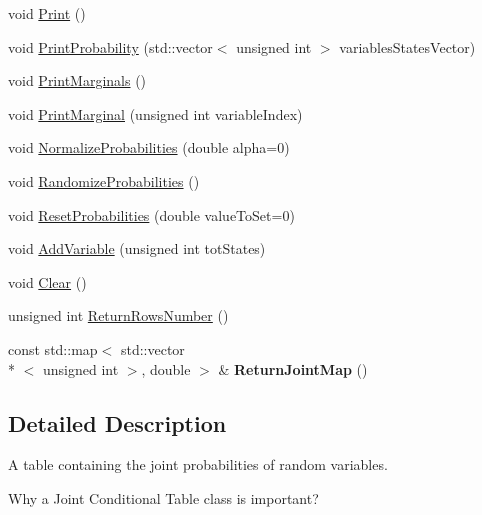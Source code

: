 \begin{DoxyCompactItemize}
\item 
void \hyperlink{classbayonet_1_1_joint_probability_table_ade691120f2a61325b94a7f9e85dd21f8}{Print} ()
\item 
void \hyperlink{classbayonet_1_1_joint_probability_table_ac52835cb75b2d635b51843abf58311a9}{Print\-Probability} (std\-::vector$<$ unsigned int $>$ variables\-States\-Vector)
\item 
void \hyperlink{classbayonet_1_1_joint_probability_table_a73e7e3843c63192e37d11bd9916f0587}{Print\-Marginals} ()
\item 
void \hyperlink{classbayonet_1_1_joint_probability_table_ada1f39508ba6a128d9f0405efe1257a7}{Print\-Marginal} (unsigned int variable\-Index)
\item 
void \hyperlink{classbayonet_1_1_joint_probability_table_a7f89dc909bd3fc68ba0859ce4b6f130c}{Normalize\-Probabilities} (double alpha=0)
\item 
void \hyperlink{classbayonet_1_1_joint_probability_table_a91133b2cf610076459a641b458c898cd}{Randomize\-Probabilities} ()
\item 
void \hyperlink{classbayonet_1_1_joint_probability_table_a0b818e8c877adcff33b4c27eb03ad31e}{Reset\-Probabilities} (double value\-To\-Set=0)
\item 
void \hyperlink{classbayonet_1_1_joint_probability_table_a34def84ddda0e58303d552055057b884}{Add\-Variable} (unsigned int tot\-States)
\item 
void \hyperlink{classbayonet_1_1_joint_probability_table_a61a82adc62427272e5aa84ace3fc15a6}{Clear} ()
\item 
unsigned int \hyperlink{classbayonet_1_1_joint_probability_table_af87920fcfa20657c2c3eb816a77ea66b}{Return\-Rows\-Number} ()
\item 
\hypertarget{classbayonet_1_1_joint_probability_table_a6172ff11f3cc9e2f6eb0ae42eb3fcb47}{const std\-::map$<$ std\-::vector\\*
$<$ unsigned int $>$, double $>$ \& {\bfseries Return\-Joint\-Map} ()}\label{classbayonet_1_1_joint_probability_table_a6172ff11f3cc9e2f6eb0ae42eb3fcb47}

\end{DoxyCompactItemize}


\subsection{Detailed Description}
A table containing the joint probabilities of random variables. 

Why a Joint Conditional Table class is important?

